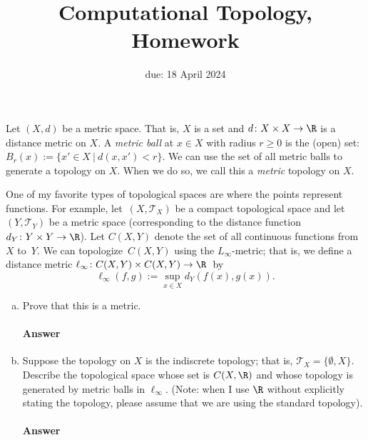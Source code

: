\documentclass{article}
\title{Computational Topology, Homework \hwnum}
\author{\todo{your name here}}
\date{due: 18 April 2024}
\begin{document}
\maketitle



Let $(X,d)$ be a metric space.  That is, $X$ is a set and $d \colon X \times X
\to \R$ is a distance metric on $X$.  A \emph{metric ball} at $x \in X$ with
radius $r \geq 0$ is the (open) set: $B_r(x) := \{x' \in X ~|~ d(x,x') < r \}$.
We can use the set of all metric balls to generate a
topology on $X$.  When we do so, we call this a \emph{metric} topology on $X$.

One of my favorite types of topological spaces are where the points represent
functions.  For example, let~$(X,\mathcal{T}_X)$ be a compact topological space
and let $(Y,\mathcal{T}_Y)$ be
a metric space (corresponding to the distance function~$d_Y
\colon Y \times Y \to \R$).  Let $C(X,Y)$ denote the set of all continuous
functions from~$X$ to~$Y$.  We can topologize~$C(X,Y)$ using the $L_{\infty}$-metric; that is,
we define a distance metric $\ell_{\infty} \colon C(X,Y) \times C(X,Y) \to
\R$~by
$$\ell_{\infty}(f,g) := \sup_{x \in X} d_Y(f(x),g(x)).$$

\begin{enumerate}[(a)]

    \item Prove that this is a metric.

        \paragraph{Answer}

    \item Suppose the topology on $X$ is the indiscrete topology; that is,
        $\mathcal{T}_X=\{\emptyset,X\}$.  Describe the topological space whose
        set is $C(X,\R)$ and whose topology is generated by metric balls in
        $\ell_{\infty}$. (Note: when I use $\R$ without explicitly stating the
        topology, please assume that we are using the standard topology).

        \paragraph{Answer}

\end{enumerate}
\end{document}
